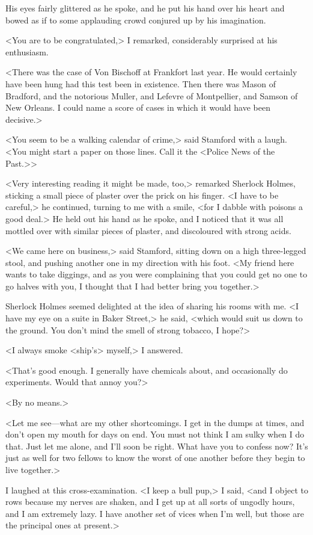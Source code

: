 His eyes fairly glittered as he spoke, and he put his hand over his heart and bowed as if to some applauding crowd conjured up by his imagination.

<You are to be congratulated,> I remarked, considerably surprised at his enthusiasm.

<There was the case of Von Bischoff at Frankfort last year. He would certainly have been hung had this test been in existence. Then there was Mason of Bradford, and the notorious Muller, and Lefevre of Montpellier, and Samson of New Orleans. I could name a score of cases in which it would have been decisive.>

<You seem to be a walking calendar of crime,> said Stamford with a laugh. <You might start a paper on those lines. Call it the <Police News of the Past.>>

<Very interesting reading it might be made, too,> remarked Sherlock Holmes, sticking a small piece of plaster over the prick on his finger. <I have to be careful,> he continued, turning to me with a smile, <for I dabble with poisons a good deal.> He held out his hand as he spoke, and I noticed that it was all mottled over with similar pieces of plaster, and discoloured with strong acids.

<We came here on business,> said Stamford, sitting down on a high three-legged stool, and pushing another one in my direction with his foot. <My friend here wants to take diggings, and as you were complaining that you could get no one to go halves with you, I thought that I had better bring you together.>

Sherlock Holmes seemed delighted at the idea of sharing his rooms with me. <I have my eye on a suite in Baker Street,> he said, <which would suit us down to the ground. You don't mind the smell of strong tobacco, I hope?>

<I always smoke <ship's> myself,> I answered.

<That's good enough. I generally have chemicals about, and occasionally do experiments. Would that annoy you?>

<By no means.>

<Let me see—what are my other shortcomings. I get in the dumps at times, and don't open my mouth for days on end. You must not think I am sulky when I do that. Just let me alone, and I'll soon be right. What have you to confess now? It's just as well for two fellows to know the worst of one another before they begin to live together.>

I laughed at this cross-examination. <I keep a bull pup,> I said, <and I object to rows because my nerves are shaken, and I get up at all sorts of ungodly hours, and I am extremely lazy. I have another set of vices when I'm well, but those are the principal ones at present.>

